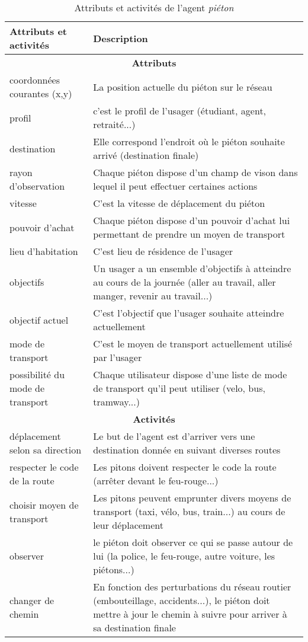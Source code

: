 \begin{table}[!ht]
\begin{center}
\caption{Attributs et activités de l'agent \textit{piéton}\label{tab:pieton}}
\begin{tabular}{|p{5cm}|p{11cm}|}
\hline
\bf Attributs et activités  &  \bf Description\\
\hline
\multicolumn{2}{|c|}{\bf Attributs}
\\
\hline
 coordonnées courantes  (x,y) & La position actuelle du piéton sur le réseau
   \\ 
 \hline
 profil   & c'est le profil de l'usager (étudiant, agent, retraité...)
  \\ 
 \hline
 destination   & Elle correspond l'endroit où le piéton souhaite arrivé (destination finale)
  \\
 \hline
 rayon d'observation  & Chaque piéton dispose d'un champ de vison dans lequel il peut effectuer certaines actions
  \\
 \hline
 vitesse  & C'est la vitesse de déplacement du piéton
 \\
\hline
 pouvoir d'achat  & Chaque piéton dispose d'un pouvoir d'achat lui permettant de prendre un moyen de transport
   \\ 
 \hline
 lieu d'habitation   & C'est lieu de résidence de l'usager
  \\ 
 \hline
 objectifs & Un usager a un ensemble d'objectifs à atteindre au cours de la journée (aller au travail, aller manger, revenir au travail...)
   \\ 
 \hline
 objectif actuel  & C'est l'objectif que l'usager souhaite atteindre actuellement
   \\ 
 \hline
mode de transport  & C'est le moyen de transport actuellement utilisé par l'usager
   \\ 
 \hline
possibilité du mode de transport  & Chaque utilisateur dispose d'une liste de mode de transport qu'il peut utiliser (velo, bus, tramway...)
 \\
\hline
 \multicolumn{2}{|c|}{\bf Activités}
 \\
 \hline
 déplacement selon sa direction & Le but de l'agent est d'arriver vers une destination donnée en suivant diverses routes
 \\
 \hline
 respecter le code de la route  & Les pitons doivent respecter le code la route (arrêter devant le feu-rouge...)
 \\
 \hline
 choisir moyen de transport  & Les pitons peuvent emprunter divers moyens de transport (taxi, vélo, bus, train...) au cours de leur déplacement
  \\
 \hline
 observer & le piéton doit observer ce qui se passe autour de lui (la police, le feu-rouge, autre voiture, les piétons...)
  \\
 \hline
 changer de chemin & En fonction des perturbations du réseau routier (embouteillage, accidents...), le piéton doit mettre à jour le chemin à suivre pour arriver à sa destination finale
 \\
\hline
\end{tabular}
\end{center}
\end{table}



